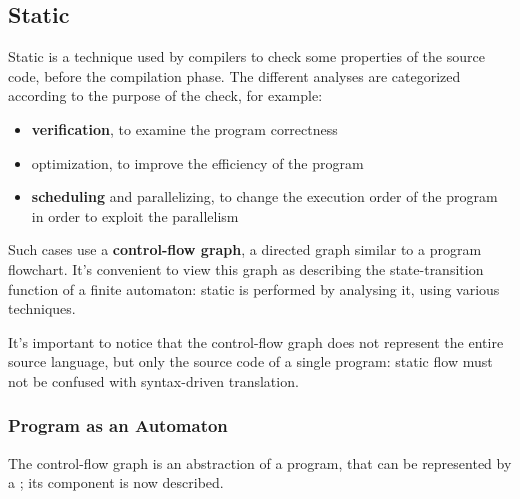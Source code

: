 \documentclass[english]{article}
\begin{document}
\subsection{Static }

Static  is a technique used by compilers to check some properties of the source code, before the compilation phase.
The different analyses are categorized according to the purpose of the check, for example:

\begin{itemize}
  \item \textbf{verification}, to examine the program correctness
  \item optimization, to improve the efficiency of the program
  \item \textbf{scheduling} and parallelizing, to change the execution order of the program in order to exploit the parallelism
\end{itemize}

Such cases use a \textbf{control-flow graph}, a directed graph similar to a program flowchart.
It's convenient to view this graph as describing the state-transition function of a finite automaton:
static  is performed by analysing it, using various techniques.

It's important to notice that the control-flow graph does not represent the entire source language, but only the source code of a single program:
static flow  must not be confused with syntax-driven translation.

\subsubsection{Program as an Automaton}

The control-flow graph is an abstraction of a program, that can be represented by a \FSA;
its component is now described.
\end{document}
